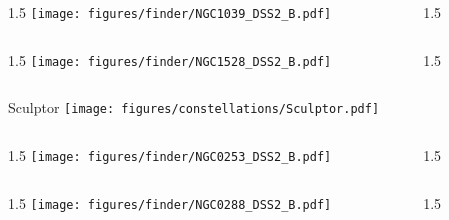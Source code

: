 \documentclass[final]{beamer}
\newlength{\colwidth}
\begin{document}

\begin{frame}[t]{}
  \begin{columns}[T]
    \begin{column}{1.5\colwidth}
      \centering
      \texttt{[image: figures/finder/NGC1039\_DSS2\_B.pdf]}
    \end{column}
    \begin{column}{1.5\colwidth}
      \Large
      
    \end{column}
  \end{columns}
  \vspace{\fill}
  \begin{columns}[T]
    \begin{column}{1.5\colwidth}
      \centering
      \texttt{[image: figures/finder/NGC1528\_DSS2\_B.pdf]}
    \end{column}
    \begin{column}{1.5\colwidth}
      \Large
      
    \end{column}
  \end{columns}
\end{frame}


\begin{frame}[t]{\LARGE Sculptor}
  \centering
  \texttt{[image: figures/constellations/Sculptor.pdf]}
\end{frame}


\begin{frame}[t]{}
  \begin{columns}[T]
    \begin{column}{1.5\colwidth}
      \centering
      \texttt{[image: figures/finder/NGC0253\_DSS2\_B.pdf]}
    \end{column}
    \begin{column}{1.5\colwidth}
      \Large
      
    \end{column}
  \end{columns}
  \vspace{\fill}
  \begin{columns}[T]
    \begin{column}{1.5\colwidth}
      \centering
      \texttt{[image: figures/finder/NGC0288\_DSS2\_B.pdf]}
    \end{column}
    \begin{column}{1.5\colwidth}
      \Large
      
    \end{column}
  \end{columns}
\end{frame}
\end{document}

